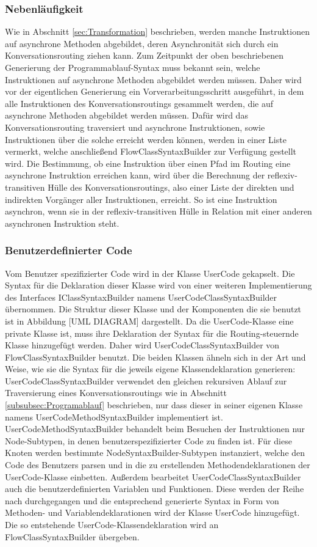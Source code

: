 \subsubsection{Nebenläufigkeit}
Wie in Abschnitt \ref{sec:Transformation} beschrieben, werden manche Instruktionen auf asynchrone Methoden abgebildet, deren Asynchronität sich durch ein Konversationsrouting ziehen kann. Zum Zeitpunkt der oben beschriebenen Generierung der Programmablauf-Syntax muss bekannt sein, welche Instruktionen auf asynchrone Methoden abgebildet werden müssen. Daher wird vor der eigentlichen Generierung ein Vorverarbeitungsschritt ausgeführt, in dem alle Instruktionen des Konversationsroutings gesammelt werden, die auf asynchrone Methoden abgebildet werden müssen. Dafür wird das Konversationsrouting traversiert und asynchrone Instruktionen, sowie Instruktionen über die solche erreicht werden können, werden in einer Liste vermerkt, welche anschließend FlowClassSyntaxBuilder zur Verfügung gestellt wird. Die Bestimmung, ob eine Instruktion über einen Pfad im Routing eine asynchrone Instruktion erreichen kann, wird über die Berechnung der reflexiv-transitiven Hülle des Konversationsroutings, also einer Liste der direkten und indirekten Vorgänger aller Instruktionen, erreicht. So ist eine Instruktion asynchron, wenn sie in der reflexiv-transitiven Hülle in Relation mit einer anderen asynchronen Instruktion steht.

\subsubsection{Benutzerdefinierter Code}
Vom Benutzer spezifizierter Code wird in der Klasse UserCode gekapselt. Die Syntax für die Deklaration dieser Klasse wird von einer weiteren Implementierung des Interfaces IClassSyntaxBuilder namens UserCodeClassSyntaxBuilder übernommen. Die Struktur dieser Klasse und der Komponenten die sie benutzt ist in Abbildung [UML DIAGRAM] dargestellt. Da die UserCode-Klasse eine private Klasse ist, muss ihre Deklaration der Syntax für die Routing-steuernde Klasse hinzugefügt werden. Daher wird UserCodeClassSyntaxBuilder von FlowClassSyntaxBuilder benutzt. Die beiden Klassen ähneln sich in der Art und Weise, wie sie die Syntax für die jeweils eigene Klassendeklaration generieren: UserCodeClassSyntaxBuilder verwendet den gleichen rekursiven Ablauf zur Traversierung eines Konversationsroutings wie in Abschnitt \ref{subsubsec:Programablauf} beschrieben, nur dass dieser in seiner eigenen Klasse namens UserCodeMethodSyntaxBuilder implementiert ist. UserCodeMethodSyntaxBuilder behandelt beim Besuchen der Instruktionen nur Node-Subtypen, in denen benutzerspezifizierter Code zu finden ist. Für diese Knoten werden bestimmte NodeSyntaxBuilder-Subtypen instanziert, welche den Code des Benutzers parsen und in die zu erstellenden Methodendeklarationen der UserCode-Klasse einbetten. Außerdem bearbeitet UserCodeClassSyntaxBuilder auch die benutzerdefinierten Variablen und Funktionen. Diese werden der Reihe nach durchgegangen und die entsprechend generierte Syntax in Form von Methoden- und Variablendeklarationen wird der Klasse UserCode hinzugefügt. Die so entstehende UserCode-Klassendeklaration wird an FlowClassSyntaxBuilder übergeben. 

